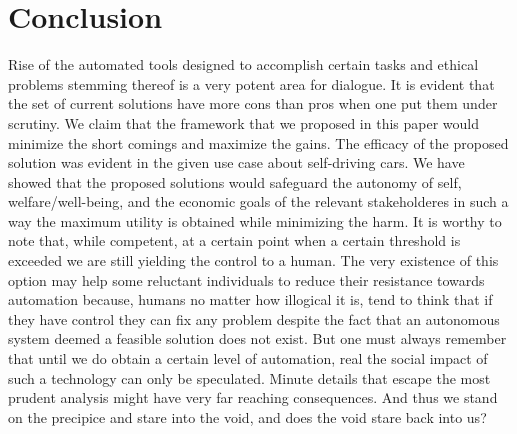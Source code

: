 \section{Conclusion}
\label{sec:-conc}
Rise of the automated tools designed to accomplish certain tasks and ethical problems stemming thereof is a very potent area for dialogue. It is evident that the set of current solutions have more cons than pros when one put them under scrutiny. We claim that the framework that we proposed in this paper would minimize the short comings and maximize the gains. The efficacy of the proposed solution was evident in the given use case about self-driving cars. We have showed that the proposed solutions would safeguard the autonomy of self, welfare/well-being, and the economic goals of the relevant stakeholderes in such a way the maximum utility is obtained while minimizing the harm. It is worthy to note that, while competent, at a certain point when a certain threshold is exceeded we are still yielding the control to a human. The very existence of this option may help some reluctant individuals to reduce their resistance towards automation because, humans no matter how illogical it is, tend to think that if they have control they can fix any problem despite the fact that an autonomous system deemed a feasible solution does not exist. But one must always remember that until we do obtain a certain level of automation, real the social impact of such a technology can only be speculated. Minute details that escape the most prudent analysis might have very far reaching consequences. And thus we stand on the precipice and stare into the void, and does the void stare back into us?

